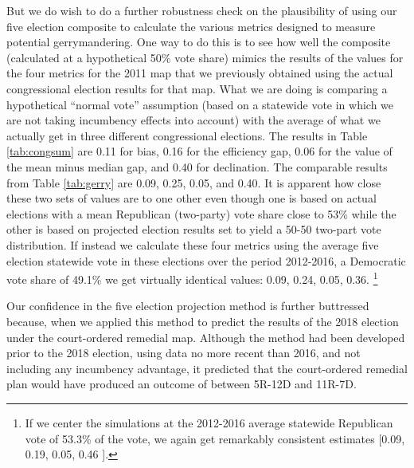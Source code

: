     But we do wish to do a further robustness check on the plausibility of using our five election composite to calculate the various metrics designed to measure potential gerrymandering. One way to do this is to see how well the composite (calculated at a hypothetical 50\% vote share) mimics the results of the values for the four metrics for the 2011 map that we previously obtained using the actual congressional election results for that map. What we are doing is comparing a hypothetical ``normal vote” \citep{Converse1966} assumption (based on a statewide vote in which we are not taking incumbency effects into account) with the average of what we actually get in three different congressional elections. The results in Table \ref{tab:congsum} are 0.11 for bias, 0.16 for the efficiency gap, 0.06 for the value of the mean minus median gap, and 0.40 for declination. The comparable results from Table \ref{tab:gerry} are 0.09, 0.25, 0.05, and 0.40. It is apparent how close these two sets of values are to one other even though one is based on actual elections with a mean Republican (two-party) vote share close to 53\% while the other is based on projected election results set to yield a 50-50 two-part vote distribution. If instead we calculate these four metrics using the average five election statewide vote in these elections over the period 2012-2016, a Democratic vote share of 49.1\% we get virtually identical values: 0.09, 0.24,  0.05, 0.36.
		\footnote{If we center the simulations at the 2012-2016 average statewide Republican vote of 53.3\% of the vote, we again get remarkably consistent estimates [0.09, 0.19, 0.05, 0.46 ].}
\par
    Our confidence in the five election projection method is further buttressed because, when we applied this method to predict the results of the 2018 election under the court-ordered remedial map. Although the method had been developed prior to the 2018 election, using data no more recent than 2016, and not including any incumbency advantage, it predicted that the court-ordered remedial plan would have produced an outcome of between 5R-12D and 11R-7D.

